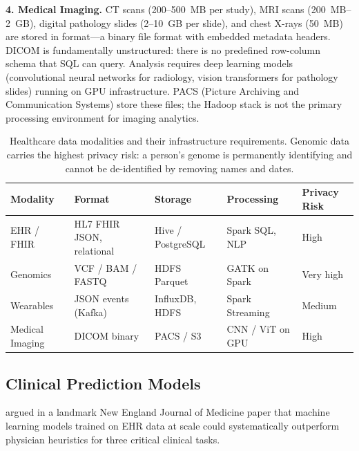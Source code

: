 \textbf{4. Medical Imaging.} CT scans (200--500~MB per study), MRI
scans (200~MB--2~GB), digital pathology slides (2--10~GB per slide),
and chest X-rays (50~MB) are stored in  format---a binary
file format with embedded metadata headers. DICOM is fundamentally
unstructured: there is no predefined row-column schema that SQL can
query. Analysis requires deep learning models (convolutional neural
networks for radiology, vision transformers for pathology slides)
running on GPU infrastructure. PACS (Picture Archiving and Communication
Systems) store these files; the Hadoop stack is not the primary
processing environment for imaging analytics.

\begin{table}[htbp]
\centering
\renewcommand{\arraystretch}{1.4}
\begin{tabular}{lp{2.5cm}p{2.5cm}p{2.5cm}p{2.0cm}}
  \toprule
  \textbf{Modality} & \textbf{Format}
    & \textbf{Storage} & \textbf{Processing} & \textbf{Privacy Risk} \\
  \midrule
  EHR / FHIR  & HL7 FHIR JSON, relational
    & Hive / PostgreSQL & Spark SQL, NLP & High \\
  Genomics     & VCF / BAM / FASTQ
    & HDFS Parquet & GATK on Spark & Very high \\
  Wearables    & JSON events (Kafka)
    & InfluxDB, HDFS & Spark Streaming & Medium \\
  Medical Imaging & DICOM binary
    & PACS / S3 & CNN / ViT on GPU & High \\
  \bottomrule
\end{tabular}
\caption{Healthcare data modalities and their infrastructure requirements.
         Genomic data carries the highest privacy risk: a person's genome
         is permanently identifying and cannot be de-identified by removing
         names and dates.}
\label{tab:health-modalities}
\end{table}

\subsection{Clinical Prediction Models}
\label{subsec:clinical-pred}

\autocite{Obermeyer2016} argued in a landmark New England Journal of
Medicine paper that machine learning models trained on EHR data at
scale could systematically outperform physician heuristics for three
critical clinical tasks.

